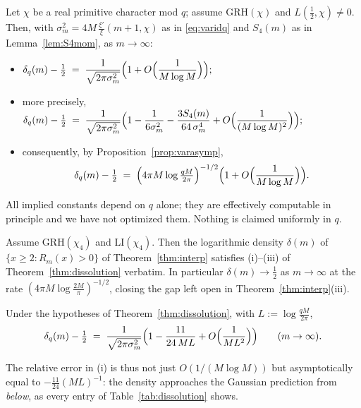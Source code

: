 \begin{theorem}\label{thm:dissolution}
Let $\chi$ be a real primitive character mod $q$; assume GRH$(\chi)$
and $L(\tfrac12,\chi)\ne0$. Then, with
$\sigma_m^2=4M\,\frac{\xi'}{\xi}(m+1,\chi)$ as in
\eqref{eq:varidq} and $S_4(m)$ as in Lemma~\ref{lem:S4mom}, as
$m\to\infty$:
\begin{itemize}
\item[(i)]
$\displaystyle
\delta_q(m)-\tfrac12\;=\;\frac{1}{\sqrt{2\pi\sigma_m^2}}
\Bigl(1+O\Bigl(\frac{1}{M\log M}\Bigr)\Bigr);
$
\item[(ii)] more precisely,
$\displaystyle
\delta_q(m)-\tfrac12\;=\;\frac{1}{\sqrt{2\pi\sigma_m^2}}
\Bigl(1-\frac{1}{6\sigma_m^2}-\frac{3S_4(m)}{64\,\sigma_m^4}
+O\Bigl(\frac{1}{(M\log M)^2}\Bigr)\Bigr);
$
\item[(iii)] consequently, by
Proposition~\ref{prop:varasymp},
\[
\delta_q(m)-\tfrac12\;=\;
\Bigl(4\pi M\log\tfrac{qM}{2\pi}\Bigr)^{-1/2}
\Bigl(1+O\Bigl(\frac{1}{M\log M}\Bigr)\Bigr).
\]
\end{itemize}
All implied constants depend on $q$ alone; they are effectively
computable in principle and we have not optimized them. Nothing is
claimed uniformly in $q$.
\end{theorem}

\begin{corollary}[the race itself, $q=4$]\label{cor:dissolution-race}
Assume GRH$(\chi_4)$ and LI$(\chi_4)$. Then the logarithmic density
$\delta(m)$ of $\{x\ge2:R_m(x)>0\}$ of Theorem~\ref{thm:interp}
satisfies (i)--(iii) of Theorem~\ref{thm:dissolution} verbatim. In
particular $\delta(m)\to\tfrac12$ as $m\to\infty$ at the rate
$(4\pi M\log\tfrac{2M}{\pi})^{-1/2}$, closing the gap left open in
Theorem~\ref{thm:interp}(iii).
\end{corollary}

\begin{corollary}\label{cor:secondorder}
Under the hypotheses of Theorem~\ref{thm:dissolution}, with
$L:=\log\tfrac{qM}{2\pi}$,
\[
\delta_q(m)-\tfrac12\;=\;\frac{1}{\sqrt{2\pi\sigma_m^2}}
\Bigl(1-\frac{11}{24\,ML}+O\Bigl(\frac{1}{ML^2}\Bigr)\Bigr)
\qquad(m\to\infty).
\]
\end{corollary}

The relative error in (i) is thus not just $O(1/(M\log M))$ but
asymptotically equal to $-\tfrac{11}{24}(ML)^{-1}$: the density
approaches the Gaussian prediction from \emph{below}, as every entry
of Table~\ref{tab:dissolution} shows.

